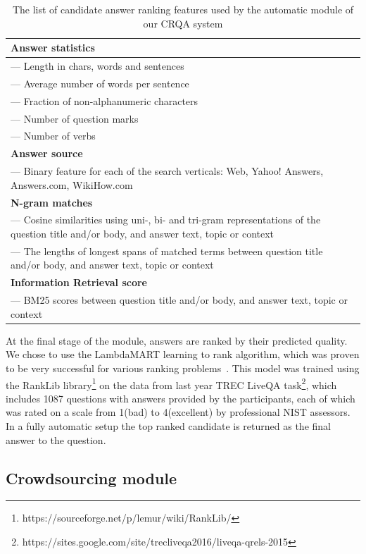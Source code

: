 \documentclass[letterpaper]{article}
\begin{document}
\begin{table}[ht]
\centering
\begin{tabular}{| p{7.8cm} |}
\hline
\textbf{Answer statistics} \\
\hline
--- Length in chars, words and sentences \\
--- Average number of words per sentence \\
--- Fraction of non-alphanumeric characters  \\
--- Number of question marks \\
--- Number of verbs  \\
\hline
\textbf{Answer source} \\
\hline
--- Binary feature for each of the search verticals: Web, Yahoo! Answers, Answers.com, WikiHow.com \\
\hline
\textbf{N-gram matches}\\
\hline
--- Cosine similarities using uni-, bi- and tri-gram representations of the question title and/or body, and answer text, topic or context\\
--- The lengths of longest spans of matched terms between question title and/or body, and answer text, topic or context\\
\hline
\textbf{Information Retrieval score}\\
\hline
--- BM25 scores between question title and/or body, and answer text, topic or context\\ 
\hline
\end{tabular}
\caption{The list of candidate answer ranking features used by the automatic module of our CRQA system}
\label{table:features}
\end{table}

At the final stage of the module, answers are ranked by their predicted quality.
We chose to use the LambdaMART learning to rank algorithm, which was proven to be very successful for various ranking problems~\cite{burges2010ranknet}.
This model was trained using the RankLib library\footnote{https://sourceforge.net/p/lemur/wiki/RankLib/} on the data from last year TREC LiveQA task\footnote{https://sites.google.com/site/trecliveqa2016/liveqa-qrels-2015}, which includes 1087 questions with answers provided by the participants, each of which was rated on a scale from 1(bad) to 4(excellent) by professional NIST assessors.
In a fully automatic setup the top ranked candidate is returned as the final answer to the question.

\subsection{Crowdsourcing module}
\label{sec:system:crowd}
\end{document}

